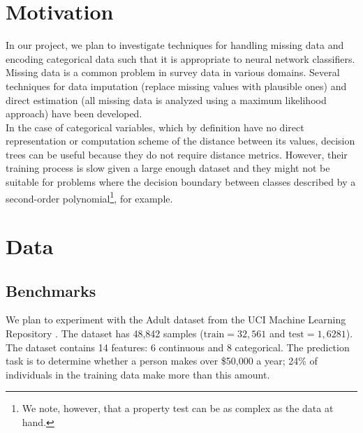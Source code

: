 \documentclass[12pt]{article}
\begin{document}
\maketitle

\section{Motivation}
In our project, we plan to investigate techniques for handling missing data and
encoding categorical data such that it is appropriate to neural network
classifiers. \\

Missing data is a common problem in survey data in various domains. Several
techniques for data imputation (replace missing values with plausible ones) and
direct estimation (all missing data is analyzed using a maximum likelihood
approach) have been developed.\citep{de2003prevention} \\

In the case of categorical variables, which by definition have no direct
representation or computation scheme of the distance between its values,
decision trees can be useful because they do not require distance metrics.
However, their training process is slow given a large enough dataset and they
might not be suitable for problems where the decision boundary between classes
described by a second-order polynomial\footnote{We note, however, that a
property test can be as complex as the data at hand.}, for
example.\citep{fayyad1996data} \\

\newpage
\section{Data}
\subsection{Benchmarks}

We plan to experiment with the Adult dataset from the UCI Machine Learning Repository \citep{Lichman2013}. The dataset has 48,842 samples ($\mathrm{train}=32,561$ and $\mathrm{test}=1,6281$). The dataset contains 14 features: 6 continuous and 8 categorical. The prediction task is to determine whether a person makes over \$50,000 a year; 24\% of individuals in the training data make more than this amount. \\
\end{document}
